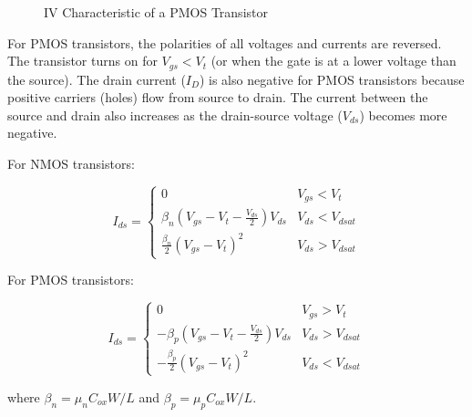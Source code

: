 \documentclass[fleqn]{article}
\begin{document}
\begin{enumerate}
		\begin{figure}[H]				
			\centerline{}
			\caption{IV Characteristic of a PMOS Transistor}
			\label{fig::iv_characteristics_pmos}
		\end{figure}
		
		For PMOS transistors, the polarities of all voltages and currents are reversed. The transistor turns on for $V_{gs} < V_t$  (or when the gate is at a lower voltage than the source). The drain current ($I_D$) is also negative for PMOS transistors because positive carriers (holes) flow from source to drain. The current between the source and drain also increases as the drain-source voltage ($V_{ds}$) becomes more negative.
		
		For NMOS transistors:
		
		\begin{equation*}
			I_{ds} = \begin{cases}
				0 & V_{gs} < V_t \\
				\beta_n\left(V_{gs}-V_t-\frac{V_{ds}}{2}\right)V_{ds} & V_{ds} < V_{dsat} \\
				\frac{\beta_n}{2}(V_{gs}-V_t)^2 & V_{ds} > V_{dsat}
			\end{cases}
		\end{equation*}
		
		For PMOS transistors:
		
		\begin{equation*}
			I_{ds} = \begin{cases}
				0 & V_{gs} > V_t \\
				-\beta_p\left(V_{gs}-V_t-\frac{V_{ds}}{2}\right)V_{ds} & V_{ds} > V_{dsat} \\
				-\frac{\beta_p}{2}(V_{gs}-V_t)^2 & V_{ds} < V_{dsat}
			\end{cases}
		\end{equation*}
		
		where $\beta_n = \mu_nC_{ox}W/L$ and $\beta_p = \mu_pC_{ox}W/L$.
		

\end{enumerate}
\end{document}

